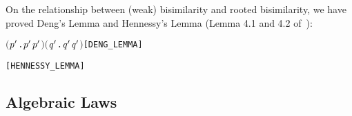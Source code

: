 On the relationship between (weak) bisimilarity and rooted bisimilarity, 
we have proved Deng's Lemma and Hennessy's Lemma
(Lemma 4.1 and 4.2 of~\citep[p.~176,~178]{Gorrieri:2015jt}):
\begin{alltt}
\HOLTokenTurnstile{}  \HOLSymConst{\HOLTokenWeakEQ}  \HOLSymConst{\HOLTokenImp{}} \ensuremath{(}\HOLSymConst{\HOLTokenExists{}}\ensuremath{\HOLBoundVar{p}\sp{\prime}}.  \HOLTokenTransBegin\HOLSymConst{\ensuremath{\tau}}\HOLTokenTransEnd \ensuremath{\HOLBoundVar{p}\sp{\prime}} \HOLSymConst{\HOLTokenConj{}} \ensuremath{\HOLBoundVar{p}\sp{\prime}} \HOLSymConst{\HOLTokenWeakEQ} \ensuremath{)} \HOLSymConst{\HOLTokenDisj{}} \ensuremath{(}\HOLSymConst{\HOLTokenExists{}}\ensuremath{\HOLBoundVar{q}\sp{\prime}}.  \HOLTokenTransBegin\HOLSymConst{\ensuremath{\tau}}\HOLTokenTransEnd \ensuremath{\HOLBoundVar{q}\sp{\prime}} \HOLSymConst{\HOLTokenConj{}}  \HOLSymConst{\HOLTokenWeakEQ} \ensuremath{\HOLBoundVar{q}\sp{\prime}}\ensuremath{)} \HOLSymConst{\HOLTokenDisj{}}  \HOLSymConst{\HOLTokenObsCongr} \hfill{[DENG_LEMMA]}
  
\HOLTokenTurnstile{}  \HOLSymConst{\HOLTokenWeakEQ}  \HOLSymConst{\HOLTokenEquiv{}}  \HOLSymConst{\HOLTokenObsCongr}  \HOLSymConst{\HOLTokenDisj{}}  \HOLSymConst{\HOLTokenObsCongr} \HOLSymConst{\ensuremath{\tau}}\HOLSymConst{\ensuremath{\ldotp}} \HOLSymConst{\HOLTokenDisj{}} \HOLSymConst{\ensuremath{\tau}}\HOLSymConst{\ensuremath{\ldotp}} \HOLSymConst{\HOLTokenObsCongr} \hfill{[HENNESSY_LEMMA]}
\end{alltt}

\subsection{Algebraic Laws}
\label{ss:alaws}

